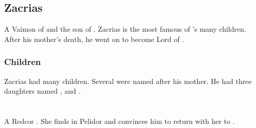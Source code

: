 \section{Zacrias}
A Vaimon of \ClanGeican and the son of \Belzir. 
Zacrias is the most famous of \Belzir's many children. 
After his mother's death, he went on to become Lord of \ClanGeican. 









\subsection{Children}
Zacrias had many children. 
Several were named after his mother. 
He had three daughters named \Belzir, \Delphine{} and \Shiaraid. 












































\chapter{\ClanRedcor}















\section{\Chyrie \Esmerel}
\index{\ChyrieEsmerel}
\index{\Esmerel!\Chyrie}
A Redcor \Matron{}. She finds  in Pelidor and convinces him to return with her to \Redce.









